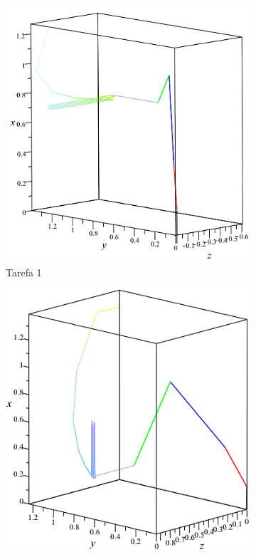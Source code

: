 \begin{figure}[h]
    \centering
    \begin{subfigure}[b]{0.46	\textwidth}
        \includegraphics[width=\textwidth]{figs/t1_anima3D_base_rig}
        \caption{Tarefa 1}
        \label{fig::t1_anima3D_base_rig}
    \end{subfigure}
    \quad %
    \begin{subfigure}[b]{0.44\textwidth}
        \includegraphics[width=\textwidth]{figs/t2_anima3D_base_rig}

\end{subfigure}
\end{figure}
